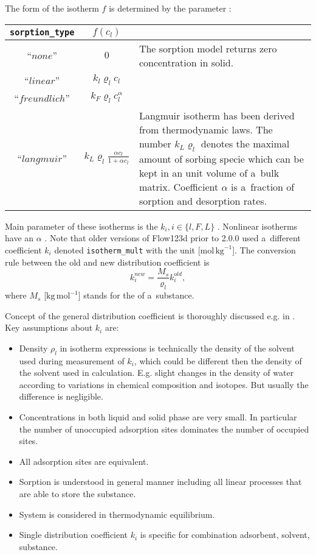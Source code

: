 The form of the isotherm $f$ is determined by the parameter :
\begin{center}
\def\arraystretch{2}
\begin{tabular}{|c|c|p{8cm}|}
\hline
\texttt{sorption\_type} & $f(c_l)$ & \\\hline
``$none$'' & $0$ & The sorption model returns zero concentration in solid.\\\hline
``$linear$'' & $k_l\varrho_l c_l$ &\\\hline
``$freundlich$'' & $k_F \varrho_l c_l^{\alpha}$ &\\\hline
``$langmuir$'' & $k_L \varrho_l \frac{\alpha c_l}{1 + \alpha c_l}$ &
       Langmuir isotherm has been derived from thermodynamic laws. The number $k_L\varrho_l$ denotes the maximal amount 
       of sorbing specie which can be kept in an unit volume of a~bulk matrix. Coefficient $\alpha$ is a~fraction of sorption and desorption rates.\\\hline
\end{tabular}
\end{center}
Main parameter of these isotherms is the  $k_i, i\in\{ l,F,L\}$ .
Nonlinear isotherms have an  $\alpha$ \units{}{}{}.
Note that older versions of Flow123d prior to 2.0.0 used a~different coefficient $k_i$ denoted \texttt{isotherm\_mult} with the unit [mol$\,\mathrm{kg}^{-1}$].
The conversion rule between the old and new distribution coefficient is
\[ k_i^{new} = \frac{M_s}{\varrho_l} k_i^{old}, \]
where $M_s$ [$\mathrm{kg}\,\mathrm{mol}^{-1}$] stands for the  of a~substance.

Concept of the general distribution coefficient is thoroughly discussed e.g. in \cite{ORIA1999}. Key assumptions about $k_i$ are:
\begin{itemize}
 \item Density $\rho_l$ in isotherm expressions is technically the density of the solvent used during measurement of $k_i$, 
 which could be different then the density of the solvent used in calculation.
 E.g. slight changes in the density of water according to variations in chemical composition and isotopes. But usually the difference is negligible. 
 \item Concentrations in both liquid and solid phase are very small. In particular the number of unoccupied adsorption sites 
 dominates the number of occupied sites. 
 \item All adsorption sites are equivalent.
 \item Sorption is understood in general manner including all linear processes that are able to store the substance.
 \item System is considered in thermodynamic equilibrium.
 \item Single distribution coefficient $k_i$ is specific for combination adsorbent, solvent, substance.
\end{itemize}


